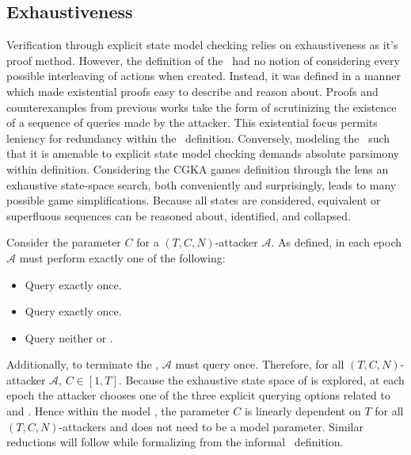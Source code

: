 

\hypertarget{sec:exhaustiveness}{%
\subsection{Exhaustiveness}\label{sec:exhaustiveness}}

Verification through explicit state model checking relies on exhaustiveness as it's proof method.
However, the definition of the \CGKAsec\ had no notion of considering every possible interleaving of actions when created.
Instead, it was defined in a manner which made existential proofs easy to describe and reason about.
Proofs and counterexamples from previous works \autocite{alwen2019double, alwen2020security} take the form of scrutinizing the existence of a sequence of queries made by the attacker.
This existential focus permits leniency for redundancy within the \CGKAsec\ definition.
Conversely, modeling the \CGKAsec\ such that it is amenable to explicit state model checking demands absolute parsimony within definition.
Considering the CGKA games definition through the lens an exhaustive state-space search, both conveniently and surprisingly, leads to many possible game simplifications.
Because all states are considered, equivalent or superfluous sequences can be reasoned about, identified, and collapsed.

Consider the parameter \(C\) for a \((T, C, N)\)-attacker \(\mathcal{A}\).
As defined, in each epoch \(\mathcal{A}\) must perform exactly one of the following:

\begin{itemize}
  \item Query  exactly once.
  \item Query   exactly once.
  \item Query neither  or .
\end{itemize}

Additionally, to terminate the \CGKAsec, \(\mathcal{A}\) must query  once.
Therefore, for all \((T, C, N)\)-attacker \(\mathcal{A}\), \(C \in [1, T]\).
Because the exhaustive state space of is explored, at each epoch the attacker chooses one of the three explicit querying options related to  and .
Hence within the model , the parameter \(C\) is linearly dependent on \(T\) for all \((T, C, N)\)-attackers and does not need to be a model parameter.
Similar reductions will follow while formalizing  from the informal \CGKAsec\ definition.


